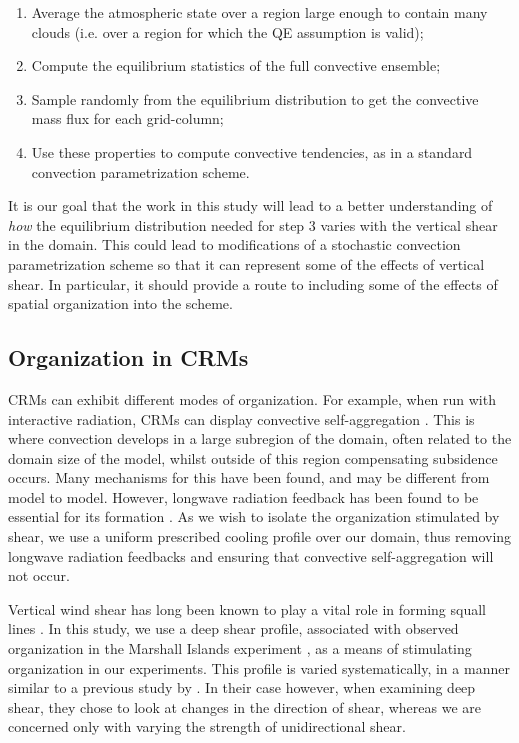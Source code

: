 \documentclass[11pt,a4paper]{article}
\newcommand\todo[1]{\textbf{TODO: #1}}
\begin{document}
\begin{enumerate}
    \item Average the atmospheric state over a region large enough to contain many clouds (i.e. over a region for which the QE assumption is valid);
    \item Compute the equilibrium statistics of the full convective ensemble;
    \item Sample randomly from the equilibrium distribution to get the convective mass flux for each grid-column;
    \item Use these properties to compute convective tendencies, as in a standard convection parametrization scheme.
\end{enumerate}

It is our goal that the work in this study will lead to a better understanding of \textit{how} the equilibrium distribution needed for step 3 varies with the vertical shear in the domain. This could lead to modifications of a stochastic convection parametrization scheme so that it can represent some of the effects of vertical shear. In particular, it should provide a route to including some of the effects of spatial organization into the scheme. 

\subsection{Organization in CRMs}
CRMs can exhibit different modes of organization. For example, when run with interactive radiation, CRMs can display convective self-aggregation \parencite{wing2017convective}. 
This is where convection develops in a large subregion of the domain, often related to the domain size of the model, whilst outside of this region compensating subsidence occurs. Many mechanisms for this have been found, and may be different from model to model. 
However, longwave radiation feedback has been found to be essential for its formation \parencite{wing2017convective}. As we wish to isolate the organization stimulated by shear, we use a uniform prescribed cooling profile over our domain, thus removing longwave radiation feedbacks and ensuring that convective self-aggregation will not occur.


Vertical wind shear has long been known to play a vital role in forming squall lines \parencite{TMM1982, RKW1988}. In this study, we use a deep shear profile, associated with observed organization in the Marshall Islands experiment \parencite{yanai1973determination}, as a means of stimulating organization in our experiments. This profile is varied systematically, in a manner similar to a previous study by \cite{RE2001}. In their case however, when examining deep shear, they chose to look at changes in the direction of shear, whereas we are concerned only with varying the strength of unidirectional shear.
\end{document}
